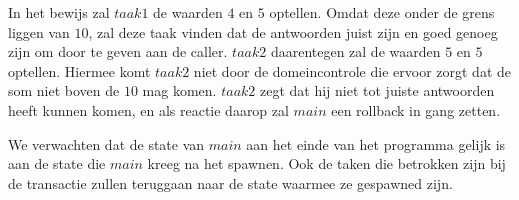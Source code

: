 In het bewijs zal \(taak1\) de waarden \(4\) en \(5\) optellen. Omdat deze onder de grens liggen van \(10\), zal deze
taak vinden dat de antwoorden juist zijn en goed genoeg zijn om door te geven aan de caller. \(taak2\) daarentegen zal
de waarden \(5\) en \(5\) optellen. Hiermee komt \(taak2\) niet door de domeincontrole die ervoor zorgt dat de som niet
boven de \(10\) mag komen. \(taak2\) zegt dat hij niet tot juiste antwoorden heeft kunnen komen, en als reactie daarop
zal \(main\) een rollback in gang zetten.

We verwachten dat de state van \(main\) aan het einde van het programma gelijk is aan de state die \(main\) kreeg na
het spawnen. Ook de taken die betrokken zijn bij de transactie zullen teruggaan naar de state waarmee ze gespawned zijn.

